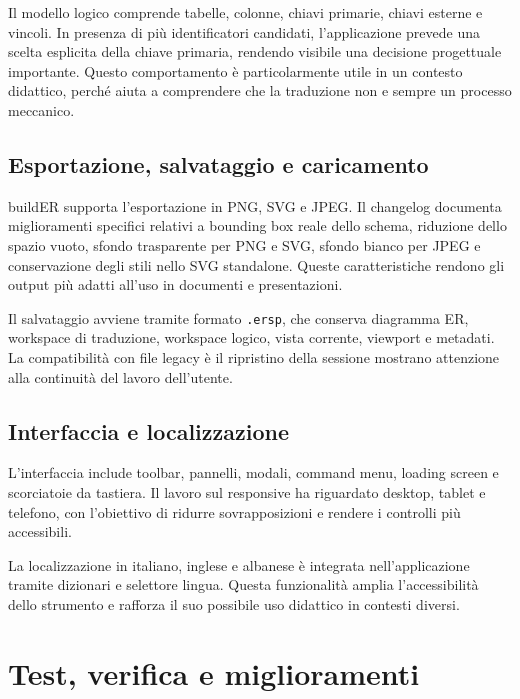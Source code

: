 \documentclass{unipd-thesis-modern}
\newcommand{\builder}{buildER}
\begin{document}
Il modello logico comprende tabelle, colonne, chiavi primarie, chiavi esterne e vincoli. In presenza di più identificatori candidati, l'applicazione prevede una scelta esplicita della chiave primaria, rendendo visibile una decisione progettuale importante. Questo comportamento è particolarmente utile in un contesto didattico, perché aiuta a comprendere che la traduzione non e sempre un processo meccanico.

\section{Esportazione, salvataggio e caricamento}

\builder{} supporta l'esportazione in PNG, SVG e JPEG. Il changelog documenta miglioramenti specifici relativi a bounding box reale dello schema, riduzione dello spazio vuoto, sfondo trasparente per PNG e SVG, sfondo bianco per JPEG e conservazione degli stili nello SVG standalone. Queste caratteristiche rendono gli output più adatti all'uso in documenti e presentazioni.

Il salvataggio avviene tramite formato \texttt{.ersp}, che conserva diagramma ER, workspace di traduzione, workspace logico, vista corrente, viewport e metadati. La compatibilità con file legacy è il ripristino della sessione mostrano attenzione alla continuità del lavoro dell'utente.

\section{Interfaccia e localizzazione}

L'interfaccia include toolbar, pannelli, modali, command menu, loading screen e scorciatoie da tastiera. Il lavoro sul responsive ha riguardato desktop, tablet e telefono, con l'obiettivo di ridurre sovrapposizioni e rendere i controlli più accessibili.

La localizzazione in italiano, inglese e albanese è integrata nell'applicazione tramite dizionari e selettore lingua. Questa funzionalità amplia l'accessibilità dello strumento e rafforza il suo possibile uso didattico in contesti diversi.


\chapter{Test, verifica e miglioramenti}
\end{document}
